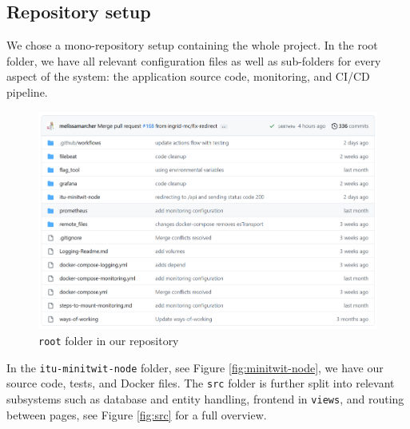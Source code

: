 \subsection{Repository setup}


We chose a mono-repository setup containing the whole project. In the root folder, we have all relevant configuration files as well as sub-folders for every aspect of the system: the application source code, monitoring, and CI/CD pipeline. 

\begin{figure}[H]
    \centering
    \includegraphics[width=.85\linewidth]{images/repo.png}
    \caption{\texttt{root} folder in our repository}
    \label{fig:repo}
\end{figure}

In the \texttt{itu-minitwit-node} folder, see Figure \ref{fig:minitwit-node}, we have our source code, tests, and Docker files. The \texttt{src} folder is further split into relevant subsystems such as database and entity handling, frontend in \texttt{views}, and routing between pages, see Figure \ref{fig:src} for a full overview.   

